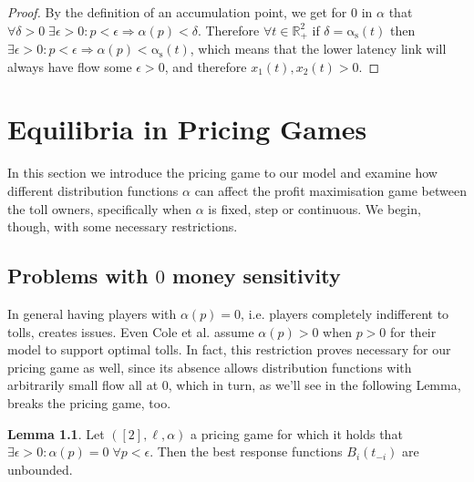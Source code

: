 \documentclass[10pt,a4paper]{book}
\newcommand{\as}{\mathrm{\alpha_s}}
\newcommand{\R}{\mathbb{R}}
\theoremstyle{definition}
\newtheorem{lemma}[definition]{Lemma}
\theoremstyle{comment}
\begin{document}
\begin{proof}
	By the definition of an accumulation point, we get for $0$ in $\alpha$ that $\forall \delta > 0 \; \exists \epsilon > 0: p < \epsilon \Rightarrow \alpha(p) < \delta$.
	Therefore $\forall t \in \R_+^2$ if $\delta = \as(t)$ then $\exists \epsilon > 0: p < \epsilon \Rightarrow \alpha(p) < \as(t)$, which means that the lower latency link will always have flow some $\epsilon > 0$, and therefore $x_1(t), x_2(t) > 0$.
\end{proof}

\cleardoublepage


\chapter{Equilibria in Pricing Games}
\label{chapter:pricing_equilibria}

In this section we introduce the pricing game to our model and examine how different distribution functions $\alpha$ can affect the profit maximisation game between the toll owners, specifically when $\alpha$ is fixed, step or continuous.
We begin, though, with some necessary restrictions.

\section{Problems with $0$ money sensitivity}

In general having players with $\alpha(p) = 0$, i.e. players completely indifferent to tolls, creates issues.
Even Cole et al. \cite{10.1145/780542.780618} assume $\alpha(p) > 0$ when $p > 0$ for their model to support optimal tolls.
In fact, this restriction proves necessary for our pricing game as well, since its absence allows distribution functions with arbitrarily small flow all at $0$, which in turn, as we'll see in the following Lemma, breaks the pricing game, too.

\begin{lemma}
	\label{lemma:a_0_0}
	Let $([2], \ell, \alpha)$ a pricing game for which it holds that $\exists \epsilon > 0: \alpha(p) = 0 \; \forall p < \epsilon$.
	Then the best response functions $B_i(t_{-i})$ are unbounded.
\end{lemma}
\end{document}
